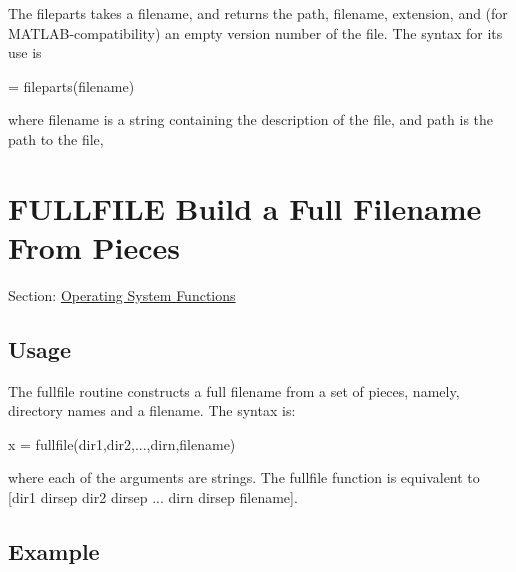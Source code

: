 The {\ttfamily fileparts} takes a filename, and returns the path, filename, extension, and (for M\-A\-T\-L\-A\-B-\/compatibility) an empty version number of the file. The syntax for its use is \begin{DoxyVerb}     = fileparts(filename)
\end{DoxyVerb}
 where {\ttfamily filename} is a string containing the description of the file, and {\ttfamily path} is the {\ttfamily path} to the file, \hypertarget{os_fullfile}{}\section{F\-U\-L\-L\-F\-I\-L\-E Build a Full Filename From Pieces}\label{os_fullfile}
Section\-: \hyperlink{sec_os}{Operating System Functions} \hypertarget{vtkwidgets_vtkxyplotwidget_Usage}{}\subsection{Usage}\label{vtkwidgets_vtkxyplotwidget_Usage}
The {\ttfamily fullfile} routine constructs a full filename from a set of pieces, namely, directory names and a filename. The syntax is\-: \begin{DoxyVerb}  x = fullfile(dir1,dir2,...,dirn,filename)
\end{DoxyVerb}
 where each of the arguments are strings. The {\ttfamily fullfile} function is equivalent to {\ttfamily \mbox{[}dir1 dirsep dir2 dirsep ... dirn dirsep filename\mbox{]}}. \hypertarget{variables_struct_Example}{}\subsection{Example}\label{variables_struct_Example}

